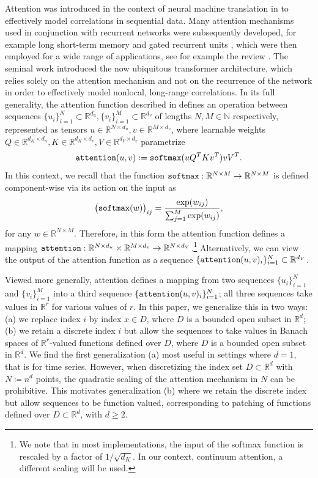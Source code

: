 \documentclass[twoside]{article}
\newcommand{\1}{\mathbbm{1}}
\newcommand{\R}{\mathbbm{R}}
\newcommand{\N}{\mathbbm{N}}
\providecommand{\mathbbm}{\mathbb} %
\begin{document}
Attention was introduced in the context of neural machine translation in \citet{bahdanau2014neural} to effectively model correlations in sequential data. Many attention mechanisms used in conjunction with recurrent networks were subsequently developed, for example long short-term memory \citep{hochreiter1997long} and gated recurrent units \citep{chung2014empirical}, which were then employed for a wide range of applications, see for example the review \citet{chung2014empirical}. The seminal work \citet{vaswani2017attention} introduced the now ubiquitous transformer architecture, which relies solely on the attention mechanism and not on the recurrence of the network in order to effectively model nonlocal, long-range correlations. In its full generality, the attention function described in \citet{vaswani2017attention} defines an operation between sequences $\{u_i\}_{i=1}^N\subset  \R^{d_u},\{v_i\}_{i=1}^M\subset  \R^{d_v}$ of lengths $N,M\in\N$ respectively, represented as tensors $u\in \R^{N\times d_u}, v\in \R^{M\times d_v}$, where learnable weights $Q\in \R^{d_K\times d_u},K\in \R^{d_K\times d_v},V\in \R^{d_V\times d_v}$ parametrize 
\begin{equation}
\label{eq:attention_vaswani}
{\tt attention}(u,v):= {\tt softmax}(uQ^TKv^T)vV^T.
\end{equation}
In this context, we recall that the function ${\tt softmax}: \R^{N\times M}\to\R^{N\times M}$ is defined component-wise via its action on the input as
\begin{equation}
\label{eq:softmax}
\bigl({\tt softmax}(w)\bigr)_{ij} = \frac{\exp(w_{ij})}{\sum_{j=1}^M\exp(w_{ij})},
\end{equation}
for any $w\in\R^{N\times M}$. Therefore, in this form the attention function defines a mapping ${\tt attention}: \R^{N \times d_u}\times \R^{M \times d_v} \to \R^{N \times d_V}$.\footnote{We note that in most implementations, the input of the softmax function is rescaled by a factor of $1/\sqrt{d_K}$. In our context, continuum attention, a different scaling will be used.} Alternatively, we can view the output of the attention function as a sequence $\{{\tt attention}(u,v)_{i}\}_{i=1}^N\subset \R^{d_V}$.

Viewed more generally, attention defines a mapping from two sequences $\{u_i\}_{i=1}^N$ and $\{v_i\}_{i=1}^M$ into a third sequence $\{{\tt attention}(u,v)_{i}\}_{i=1}^N$; all three sequences take values in $\R^{r}$ for various values of $r$. In this paper, we generalize this in two ways: (a) we replace index $i$ by index $x\in D$, where $D$ is a bounded open subset in $\R^{d}$; (b) we retain a discrete index $i$ but allow the sequences to take values in Banach spaces of $\R^r$-valued functions defined over $D$, where $D$ is a bounded open subset in $\R^{d}$. We find the first generalization (a) most useful in settings where $d=1$,
that is for time series. However, when discretizing the index set $D\subset \R^d$ with $N\coloneqq n^d$ points, the quadratic scaling of the attention mechanism in $N$ can be prohibitive. This motivates generalization (b) where we retain the discrete index but allow sequences to be function valued, corresponding to patching of functions defined over $D\subset \R^d$, with $d \ge 2.$
\end{document}
